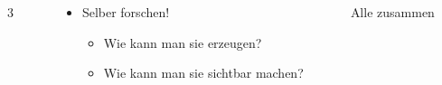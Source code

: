 \documentclass{beamer}
\begin{document}
\begin{frame}
  \begin{columns}
    \begin{column}{0.05\textwidth}
      \centering
      \alert{\Huge 3}
    \end{column}
    \begin{column}{0.68\textwidth}
      \begin{itemize}
      \item Selber forschen!
        \begin{itemize}
        \item Wie kann man sie erzeugen?
        \item Wie kann man sie sichtbar machen?
        \end{itemize}
      \end{itemize}
    \end{column}
    \begin{column}{0.27\textwidth}
      \centering
      \alert{Alle zusammen}
    \end{column}
  \end{columns}
\end{frame}


\end{document}
